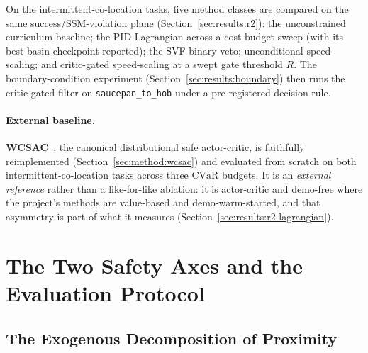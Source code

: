 \documentclass[11pt,a4paper]{report}
\newcommand{\ssm}{SSM}
\newcommand{\cvar}{\ensuremath{\mathrm{CVaR}}}
\begin{document}
On the intermittent-co-location tasks, five method classes are
compared on the same success/\ssm{}-violation plane
(Section~\ref{sec:results:r2}): the unconstrained curriculum
baseline; the PID-Lagrangian across a cost-budget sweep (with its
best basin checkpoint reported); the SVF binary veto; unconditional
speed-scaling; and critic-gated speed-scaling at a swept gate
threshold $R$. The boundary-condition experiment
(Section~\ref{sec:results:boundary}) then runs the critic-gated
filter on \texttt{saucepan\_to\_hob} under a pre-registered decision
rule.

\paragraph{External baseline.}
\textbf{WCSAC}~\cite{yang2021wcsac}, the canonical distributional
safe actor-critic, is faithfully reimplemented
(Section~\ref{sec:method:wcsac}) and evaluated from scratch on both
intermittent-co-location tasks across three \cvar{} budgets. It is an
\emph{external reference} rather than a like-for-like ablation: it is
actor-critic and demo-free where the project's methods are
value-based and demo-warm-started, and that asymmetry is part of what
it measures (Section~\ref{sec:results:r2-lagrangian}).

\section{The Two Safety Axes and the Evaluation Protocol}
\label{sec:setup:metrics}

\subsection{The Exogenous Decomposition of Proximity}
\label{sec:setup:metrics:primary}
\label{sec:exogenous}
\end{document}
